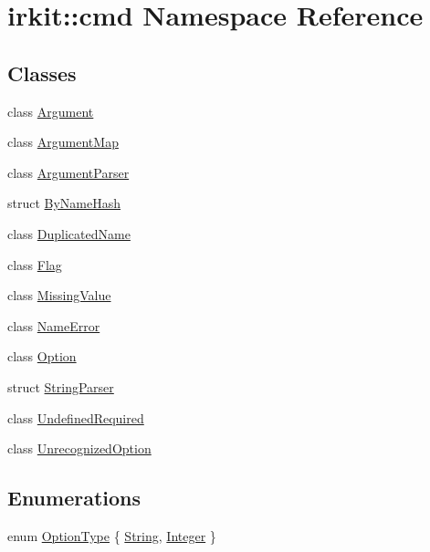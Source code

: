 \hypertarget{namespaceirkit_1_1cmd}{}\section{irkit\+:\+:cmd Namespace Reference}
\label{namespaceirkit_1_1cmd}
\subsection*{Classes}
\begin{DoxyCompactItemize}
\item 
class \mbox{\hyperlink{classirkit_1_1cmd_1_1Argument}{Argument}}
\item 
class \mbox{\hyperlink{classirkit_1_1cmd_1_1ArgumentMap}{Argument\+Map}}
\item 
class \mbox{\hyperlink{classirkit_1_1cmd_1_1ArgumentParser}{Argument\+Parser}}
\item 
struct \mbox{\hyperlink{structirkit_1_1cmd_1_1ByNameHash}{By\+Name\+Hash}}
\item 
class \mbox{\hyperlink{classirkit_1_1cmd_1_1DuplicatedName}{Duplicated\+Name}}
\item 
class \mbox{\hyperlink{classirkit_1_1cmd_1_1Flag}{Flag}}
\item 
class \mbox{\hyperlink{classirkit_1_1cmd_1_1MissingValue}{Missing\+Value}}
\item 
class \mbox{\hyperlink{classirkit_1_1cmd_1_1NameError}{Name\+Error}}
\item 
class \mbox{\hyperlink{classirkit_1_1cmd_1_1Option}{Option}}
\item 
struct \mbox{\hyperlink{structirkit_1_1cmd_1_1StringParser}{String\+Parser}}
\item 
class \mbox{\hyperlink{classirkit_1_1cmd_1_1UndefinedRequired}{Undefined\+Required}}
\item 
class \mbox{\hyperlink{classirkit_1_1cmd_1_1UnrecognizedOption}{Unrecognized\+Option}}
\end{DoxyCompactItemize}
\subsection*{Enumerations}
\begin{DoxyCompactItemize}
\item 
enum \mbox{\hyperlink{namespaceirkit_1_1cmd_ad11df6b42e510eb375d7c9410f4a3700}{Option\+Type}} \{ \mbox{\hyperlink{namespaceirkit_1_1cmd_ad11df6b42e510eb375d7c9410f4a3700a4bd4c9d25d31ac024d7bd7ddbc24cbc6}{String}}, 
\mbox{\hyperlink{namespaceirkit_1_1cmd_ad11df6b42e510eb375d7c9410f4a3700a0412b1136d9fc25aca3560d1f8786037}{Integer}}
 \}
\end{DoxyCompactItemize}


